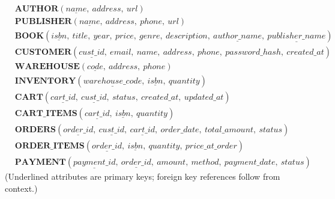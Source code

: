 \begin{align*}
&\textbf{AUTHOR}(\underline{name},\ address,\ url) \\
&\textbf{PUBLISHER}(\underline{name},\ address,\ phone,\ url) \\
&\textbf{BOOK}(\underline{isbn},\ title,\ year,\ price,\ genre,\ description,\ \underline{author\_name},\ \underline{publisher\_name}) \\
&\textbf{CUSTOMER}(\underline{cust\_id},\ email,\ name,\ address,\ phone,\ password\_hash,\ created\_at) \\
&\textbf{WAREHOUSE}(\underline{code},\ address,\ phone) \\
&\textbf{INVENTORY}(\underline{warehouse\_code},\ \underline{isbn},\ quantity) \\
&\textbf{CART}(\underline{cart\_id},\ \underline{cust\_id},\ status,\ created\_at,\ updated\_at) \\
&\textbf{CART\_ITEMS}(\underline{cart\_id},\ \underline{isbn},\ quantity) \\
&\textbf{ORDERS}(\underline{order\_id},\ \underline{cust\_id},\ \underline{cart\_id},\ order\_date,\ total\_amount,\ status) \\
&\textbf{ORDER\_ITEMS}(\underline{order\_id},\ \underline{isbn},\ quantity,\ price\_at\_order) \\
&\textbf{PAYMENT}(\underline{payment\_id},\ \underline{order\_id},\ amount,\ method,\ payment\_date,\ status)
\end{align*}
(Underlined attributes are primary keys; foreign key references follow from context.)
